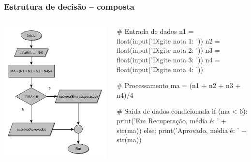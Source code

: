\documentclass{beamer}
\begin{document}
\begin{frame}[fragile]
\frametitle{Estrutura de decisão -- composta}


\begin{columns}
	\begin{column}{0.5\textwidth}	
	\center \includegraphics[scale=0.4]{./figures/media-if.pdf}	
	\end{column}
	
\begin{column}{0.5\textwidth}  %
\begin{python}
# Entrada de dados
n1 = float(input('Digite nota 1: '))
n2 = float(input('Digite nota 2: '))
n3 = float(input('Digite nota 3: '))
n4 = float(input('Digite nota 4: '))

# Processamento
ma = (n1 + n2 + n3 + n4)/4

# Saída de dados condicionada
if (ma < 6):
    print('Em Recuperação, média é: '  + str(ma))
else:
    print('Aprovado, média é: ' + str(ma))
\end{python}  
\end{column}
\end{columns}
\end{frame}
\end{document}
